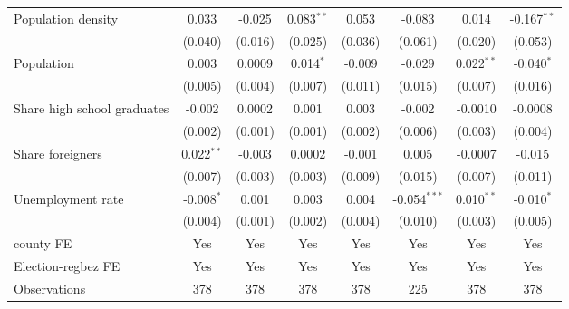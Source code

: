 \begin{table}[htbp]
\begin{tabular}{lccccccc}
      Population density                                      & 0.033         & -0.025       & 0.083$^{**}$   & 0.053         & -0.083         & 0.014          & -0.167$^{**}$\\   
                                                              & (0.040)       & (0.016)      & (0.025)        & (0.036)       & (0.061)        & (0.020)        & (0.053)\\   
      Population                                              & 0.003         & 0.0009       & 0.014$^{*}$    & -0.009        & -0.029         & 0.022$^{**}$   & -0.040$^{*}$\\   
                                                              & (0.005)       & (0.004)      & (0.007)        & (0.011)       & (0.015)        & (0.007)        & (0.016)\\   
      Share high school graduates                             & -0.002        & 0.0002       & 0.001          & 0.003         & -0.002         & -0.0010        & -0.0008\\   
                                                              & (0.002)       & (0.001)      & (0.001)        & (0.002)       & (0.006)        & (0.003)        & (0.004)\\   
      Share foreigners                                        & 0.022$^{**}$  & -0.003       & 0.0002         & -0.001        & 0.005          & -0.0007        & -0.015\\   
                                                              & (0.007)       & (0.003)      & (0.003)        & (0.009)       & (0.015)        & (0.007)        & (0.011)\\   
      Unemployment rate                                       & -0.008$^{*}$  & 0.001        & 0.003          & 0.004         & -0.054$^{***}$ & 0.010$^{**}$   & -0.010$^{*}$\\   
                                                              & (0.004)       & (0.001)      & (0.002)        & (0.004)       & (0.010)        & (0.003)        & (0.005)\\   
      county FE                                               & Yes           & Yes          & Yes            & Yes           & Yes            & Yes            & Yes\\  
      Election-regbez FE                                      & Yes           & Yes          & Yes            & Yes           & Yes            & Yes            & Yes\\  
      Observations                                            & 378           & 378          & 378            & 378           & 225            & 378            & 378\\  

\end{tabular}
\end{table}
